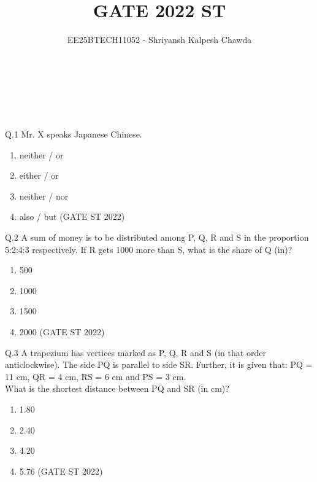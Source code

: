 \documentclass[journal,12pt,onecolumn]{IEEEtran}
\title{\textbf{GATE 2022 ST}}
\author{ EE25BTECH11052 - Shriyansh Kalpesh Chawda}
\theoremstyle{remark}
\begin{document}
	
	\maketitle
	\newpage
	\\
	\\
	\\
	\\
Q.1 Mr. X speaks \underline{\hspace{2cm}} Japanese \underline{\hspace{2cm}} Chinese.                                       
\begin{enumerate}[label=(\Alph*)]
		\item neither / or
		\item either / or
		\item neither / nor
		\item also / but
		\hfill (GATE ST 2022)
	\end{enumerate}
	\vspace{2em}
	Q.2 A sum of money is to be distributed among P, Q, R and S in the proportion 5:2:4:3 respectively.
	If R gets 1000 more than S, what is the share of Q (in)?
	\begin{enumerate}[label=(\Alph*)]
		\item 500
		\item 1000
		\item 1500
		\item 2000
		\hfill (GATE ST 2022)
	\end{enumerate}
		\vspace{2em}
Q.3 A trapezium has vertices marked as P, Q, R and S (in that order anticlockwise). The side PQ is parallel to side SR. Further, it is given that: PQ = 11 cm, QR = 4 cm, RS = 6 cm and PS = 3 cm. \\
What is the shortest distance between PQ and SR (in cm)?
	\begin{enumerate}[label=(\Alph*)]
		\item 1.80
		\item 2.40
		\item 4.20
		\item 5.76
		\hfill (GATE ST 2022)
	\end{enumerate}
		\vspace{2em}
		
\end{document}
